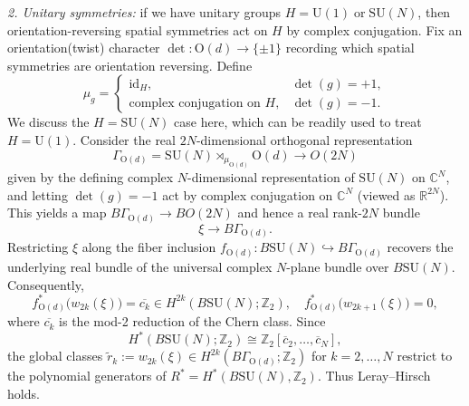 \documentclass[aps,prx,reprint,superscriptaddress,twocolumn,amsmath,amssymb,amsfonts, nofootinbib]{revtex4-2}
\newcommand{\U}{\text{U}}
\newcommand{\Z}{\mathbb{Z}}
\theoremstyle{apsstyle}
\begin{document}
\textit{2. Unitary symmetries:} if we have unitary groups $H=\U(1)\;\text{or}\;\mathrm{SU}(N)$, then orientation-reversing spatial symmetries act on $H$ by complex conjugation. Fix an orientation(twist) character $\det:\mathrm{O}(d)\to\{\pm1\}$ recording which spatial symmetries are orientation reversing. Define
\begin{equation*}
    \mu_{g}=\begin{cases}
    \mathrm{id}_H,& \det(g)=+1,\\[2pt]
    \text{complex conjugation on }H,& \det(g)=-1.
    \end{cases}
\end{equation*}
We discuss the $H=\mathrm{SU}(N)$ case here, which can be readily used to treat $H=\U(1)$. Consider the real $2N$-dimensional orthogonal representation  
\begin{equation*}
\Gamma_{\mathrm{O}(d)}=\mathrm{SU}(N)\rtimes_{\mu_{\mathrm{O}(d)}} \mathrm{O}(d)\longrightarrow O(2N)  
\end{equation*}
given by the defining complex $N$-dimensional representation of $\mathrm{SU}(N)$ on $\mathbb C^N$, and letting $\det(g)=-1$ act by complex conjugation on $\mathbb C^N$ (viewed as $\mathbb R^{2N}$). This yields a map $B\Gamma_{\mathrm{O}(d)}\to BO(2N)$ and hence a real rank-$2N$ bundle 
\begin{equation*}
\xi\to B\Gamma_{\mathrm{O}(d)}.
\end{equation*}
Restricting $\xi$ along the fiber inclusion $f_{\mathrm{O}(d)}:B\mathrm{SU}(N)\hookrightarrow B\Gamma_{\mathrm{O}(d)}$ recovers the underlying real bundle of the universal complex $N$-plane bundle over $B\mathrm{SU}(N)$. Consequently,  
\begin{equation*}
f_{\mathrm{O}(d)}^{*}\big(w_{2k}(\xi)\big)=\overline{c_k}\in H^{2k}(B\mathrm{SU}(N);\mathbb Z_2),\quad  f_{\mathrm{O}(d)}^{*}\big(w_{2k+1}(\xi)\big)=0,  
\end{equation*}
where $\overline{c_k}$ is the mod-2 reduction of the Chern class. Since 
\begin{equation*}
H^{*}(B\mathrm{SU}(N);\mathbb Z_2)\cong \mathbb Z_2[\overline c_2,\dots,\overline c_N],
\end{equation*}
the global classes $\widetilde{r}_k:=w_{2k}(\xi)\in H^{2k}(B\Gamma_{\mathrm{O}(d)};\mathbb Z_2)$ for $k=2,\dots,N$ restrict to the polynomial generators of $R^{*}=H^{*}(B\mathrm{SU}(N),\Z_{2})$. Thus Leray–Hirsch holds.

\bigskip 
    
\end{document}
